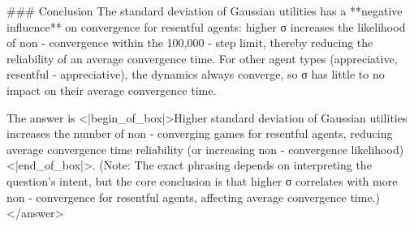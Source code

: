 ### Conclusion  
The standard deviation of Gaussian utilities has a **negative influence** on convergence for resentful agents: higher σ increases the likelihood of non - convergence within the 100,000 - step limit, thereby reducing the reliability of an average convergence time. For other agent types (appreciative, resentful - appreciative), the dynamics always converge, so σ has little to no impact on their average convergence time.  

The answer is <|begin_of_box|>Higher standard deviation of Gaussian utilities increases the number of non - converging games for resentful agents, reducing average convergence time reliability (or increasing non - convergence likelihood)<|end_of_box|>. (Note: The exact phrasing depends on interpreting the question’s intent, but the core conclusion is that higher σ correlates with more non - convergence for resentful agents, affecting average convergence time.)</answer>